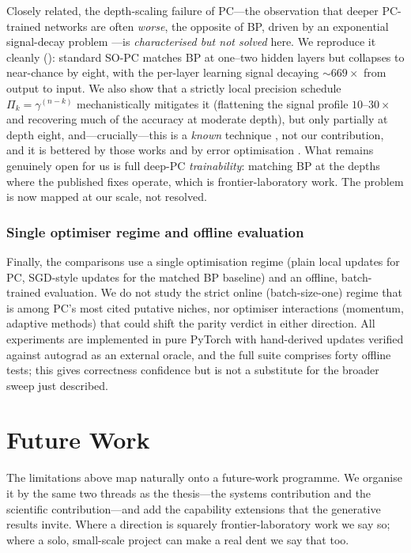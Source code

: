 Closely related, the depth-scaling failure of PC---the observation that deeper
PC-trained networks are often \emph{worse}, the opposite of BP, driven by an
exponential signal-decay problem \citep{goemaere2025epc}---is \emph{characterised but
not solved} here. We reproduce it cleanly (): standard SO-PC matches
BP at one--two hidden layers but collapses to near-chance by eight, with the per-layer
learning signal decaying $\sim\!669\times$ from output to input. We also show that a
strictly local precision schedule $\Pi_k=\gamma^{(n-k)}$ mechanistically mitigates it
(flattening the signal profile $10$--$30\times$ and recovering much of the accuracy at
moderate depth), but only partially at depth eight, and---crucially---this is a
\emph{known} technique \citep{qi2025settling, innocenti2025mupc}, not our contribution,
and it is bettered by those works and by error optimisation \citep{goemaere2025epc}.
What remains genuinely open for us is full deep-PC \emph{trainability}: matching BP at
the depths where the published fixes operate, which is frontier-laboratory work. The
problem is now mapped at our scale, not resolved.

\subsubsection{Single optimiser regime and offline evaluation}

Finally, the comparisons use a single optimisation regime (plain local updates for PC,
SGD-style updates for the matched BP baseline) and an offline, batch-trained
evaluation. We do not study the strict online (batch-size-one) regime that is among
PC's most cited putative niches, nor optimiser interactions (momentum, adaptive
methods) that could shift the parity verdict in either direction. All experiments are
implemented in pure PyTorch with hand-derived updates verified against autograd as an
external oracle, and the full suite comprises forty offline tests; this gives
correctness confidence but is not a substitute for the broader sweep just described.

\section{Future Work}

The limitations above map naturally onto a future-work programme. We organise it by
the same two threads as the thesis---the systems contribution and the scientific
contribution---and add the capability extensions that the generative results invite.
Where a direction is squarely frontier-laboratory work we say so; where a solo,
small-scale project can make a real dent we say that too.

